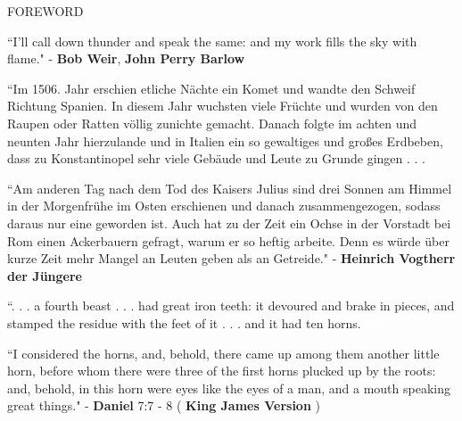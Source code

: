 \documentclass[11pt]{article}
\begin{document}
\vspace*{0.01\baselineskip}

\begingroup
\begin{center}
\huge FOREWORD
\end{center}
\endgroup

\begingroup
\begin{center}
``I'll call down thunder and speak the same: and my work fills the sky with flame."
\rightskip\leftskip
\phantom{text} \hfill - \textbf{Bob Weir}, \textbf{John Perry Barlow}
\end{center}
\endgroup

\vspace*{0.1\baselineskip}

\begingroup
\begin{center}
``Im 1506. Jahr erschien etliche Nächte ein Komet und wandte den Schweif Richtung Spanien. In diesem Jahr wuchsten viele Früchte und wurden von den Raupen oder Ratten völlig zunichte gemacht. Danach folgte im achten und neunten Jahr hierzulande und in Italien ein so gewaltiges und großes Erdbeben, dass zu Konstantinopel sehr viele Gebäude und Leute zu Grunde gingen . . . 
\rightskip\leftskip
\phantom{text} \hfill \textcolor{white}{fuck}
\end{center}
\endgroup

\begingroup
\begin{center}
``Am anderen Tag nach dem Tod des Kaisers Julius sind drei Sonnen am Himmel in der Morgenfrühe im Osten erschienen und danach zusammengezogen, sodass daraus nur eine geworden ist. Auch hat zu der Zeit ein Ochse in der Vorstadt bei Rom einen Ackerbauern gefragt, warum er so heftig arbeite. Denn es würde über kurze Zeit mehr Mangel an Leuten geben als an Getreide."
\rightskip\leftskip
\phantom{text} \hfill - \textbf{Heinrich Vogtherr der Jüngere}
\end{center}
\endgroup

\vspace*{0.1\baselineskip}

\begingroup
\begin{center}
``. . . a fourth beast . . . had great iron teeth: it devoured and brake in pieces, and stamped the residue with the feet of it . . . and it had ten horns.
\rightskip\leftskip
\phantom{text} \hfill \textcolor{white}{fuck}
\end{center}
\endgroup

\begingroup
\begin{center}
``I considered the horns, and, behold, there came up among them another little horn, before whom there were three of the first horns plucked up by the roots: and, behold, in this horn were eyes like the eyes of a man, and a mouth speaking great things."
\rightskip\leftskip
\phantom{text} \hfill - \textbf{Daniel} 7:7 - 8 ( \textbf{King James Version} )
\end{center}
\endgroup
\end{document}
